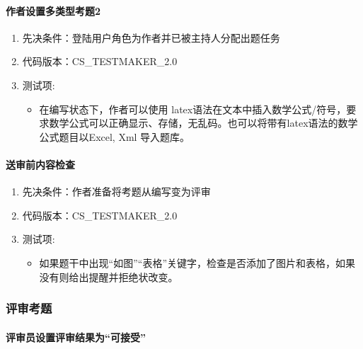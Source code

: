 \documentclass[hyperref, a4paper]{ctexart}
\providecommand{\tightlist}{%
  \setlength{\itemsep}{0pt}\setlength{\parskip}{0pt}}
\let\oldparagraph\paragraph
\renewcommand{\paragraph}[1]{\oldparagraph{#1}\mbox{}}
\begin{document}
\hypertarget{ux4f5cux8005ux8bbeux7f6eux591aux7c7bux578bux8003ux98982}{%
\paragraph{作者设置多类型考题2}\label{ux4f5cux8005ux8bbeux7f6eux591aux7c7bux578bux8003ux98982}}

\begin{enumerate}
\def\labelenumi{\arabic{enumi}.}
\tightlist
\item
  先决条件：登陆用户角色为作者并已被主持人分配出题任务
\item
  代码版本：CS\_TESTMAKER\_2.0
\item
  测试项:

  \begin{itemize}
  \tightlist
  \item
    在编写状态下，作者可以使用
    latex语法在文本中插入数学公式/符号，要求数学公式可以正确显示、存储，无乱码。也可以将带有latex语法的数学公式题目以Excel,
    Xml 导入题库。
  \end{itemize}
\end{enumerate}

\hypertarget{ux9001ux5ba1ux524dux5185ux5bb9ux68c0ux67e5}{%
\paragraph{送审前内容检查}\label{ux9001ux5ba1ux524dux5185ux5bb9ux68c0ux67e5}}

\begin{enumerate}
\def\labelenumi{\arabic{enumi}.}
\tightlist
\item
  先决条件：作者准备将考题从编写变为评审
\item
  代码版本：CS\_TESTMAKER\_2.0
\item
  测试项:

  \begin{itemize}
  \tightlist
  \item
    如果题干中出现``如图''``表格''关键字，检查是否添加了图片和表格，如果没有则给出提醒并拒绝状改变。
  \end{itemize}
\end{enumerate}

\hypertarget{ux8bc4ux5ba1ux8003ux9898}{%
\subsubsection{评审考题}\label{ux8bc4ux5ba1ux8003ux9898}}

\hypertarget{ux8bc4ux5ba1ux5458ux8bbeux7f6eux8bc4ux5ba1ux7ed3ux679cux4e3aux53efux63a5ux53d7}{%
\paragraph{评审员设置评审结果为``可接受''}\label{ux8bc4ux5ba1ux5458ux8bbeux7f6eux8bc4ux5ba1ux7ed3ux679cux4e3aux53efux63a5ux53d7}}
\end{document}
